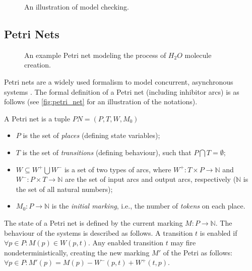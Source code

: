 \begin{figure}[!ht]
	\centering
	
	\caption{An illustration of model checking.}
	\label{fig:model_checking}
\end{figure}

\subsection{Petri Nets}\label{ssec:petri-net}

\begin{figure}[!ht]
	\centering
	
	\caption{An example Petri net modeling the process of \(H_2O\) molecule creation.}
	\label{fig:petri_net}
\end{figure}

Petri nets are a widely used formalism to model concurrent, asynchronous systems \cite{24143}. The formal definition of a Petri net (including inhibitor arcs) is as follows (see \autoref{fig:petri_net} for an illustration of the notations).

\begin{definition}
	
	A Petri net is a tuple \( PN = (P, T, W, M_0) \)
	
	\begin{itemize}
		\item \(P\) is the set of \emph{places} (defining state variables);
		\item \(T\) is the set of \emph{transitions} (defining behaviour), such that \( P \bigcap T = \emptyset \);
		\item \(W \subseteq W^+ \bigcup W^- \) is a set of two types of arcs, where \(  W^+ : T \times P \rightarrow \mathbb{N}\) and \( W^- : P \times T \rightarrow \mathbb{N} \) are the set of input arcs and output arcs, respectively (\( \mathbb{N} \) is the set of all natural numbers);
		\item \(M_0 : P \rightarrow \mathbb{N} \) is the \emph{initial marking}, i.e., the number of \emph{tokens} on each place.
	\end{itemize}
\end{definition}

The state of a Petri net is defined by the current marking \( M : P \rightarrow \mathbb{N} \). The behaviour of the systems is described as follows. A transition \( t \) is enabled if \( \forall p \in P : M(p) \in W(p, t) \). Any enabled transition \(t\) may fire nondeterministically, creating the new marking \( M' \) of the Petri as follows: \( \forall p \in P : M'(p) = M(p) - W^-(p, t) + W^+(t, p) \).

